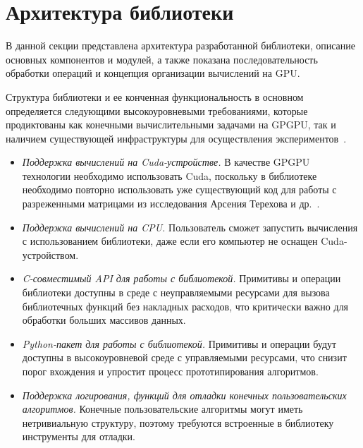 \section{Архитектура библиотеки}

В данной секции представлена архитектура разработанной библиотеки, описание основных компонентов и модулей, а также показана последовательность обработки операций и концепция организации вычислений на GPU.

Структура библиотеки и ее конченная функциональность в основном определяется следующими высокоуровневыми требованиями, которые продиктованы как конечными вычислительными задачами на GPGPU, так и наличием существующей инфраструктуры для осуществления экспериментов~\cite{net:cfpq_py_algo}.

\begin{itemize}[noitemsep,topsep=0pt,parsep=0pt,partopsep=0pt]
    \item \textit{Поддержка вычислений на Cuda-устройстве.} В качестве GPGPU технологии необходимо использовать Cuda, поскольку в библиотеке необходимо повторно использовать уже существующий код для работы с разреженными матрицами из исследования Арсения Терехова и др.~\cite{inproceedings:cfqp_matrix_with_single_source}.
    \item \textit{Поддержка вычислений на CPU.} Пользователь сможет запустить вычисления с использованием библиотеки, даже если его компьютер не оснащен Cuda-устройством.
    \item \textit{C-совместимый API для работы с библиотекой.} Примитивы и операции библиотеки доступны в среде с неуправляемыми ресурсами для вызова библиотечных функций без накладных расходов, что критически важно для обработки больших массивов данных.
    \item \textit{Python-пакет для работы с библиотекой.} Примитивы и операции будут доступны в высокоуровневой среде с управляемыми ресурсами, что снизит порог вхождения и упростит процесс прототипирования алгоритмов.
    \item \textit{Поддержка логирования, функций для отладки конечных пользовательских алгоритмов.} Конечные пользовательские алгоритмы могут иметь нетривиальную структуру, поэтому требуются встроенные в библиотеку инструменты для отладки.
\end{itemize}

